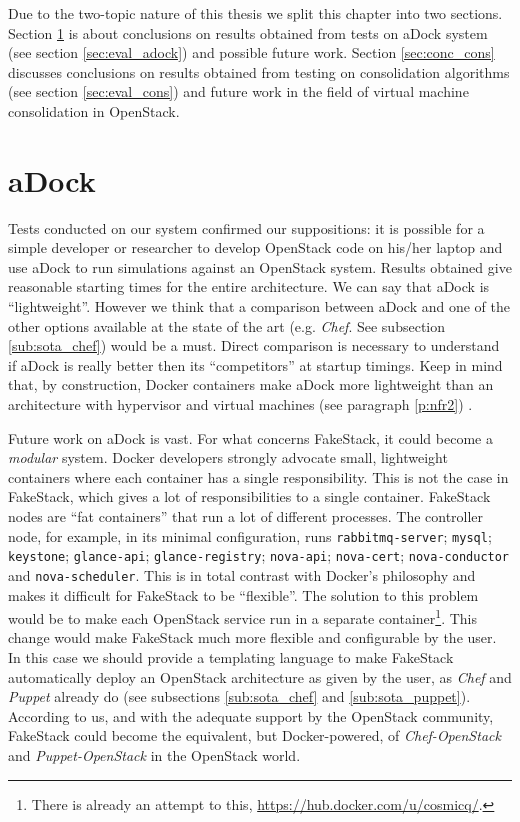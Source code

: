 
Due to the two-topic nature of this thesis we split this chapter into two sections. Section \ref{sec:conc_adock} is about conclusions on results obtained from tests on aDock system (see section \ref{sec:eval_adock}) and possible future work. Section \ref{sec:conc_cons} discusses conclusions on results obtained from testing on consolidation algorithms (see section \ref{sec:eval_cons}) and future work in the field of virtual machine consolidation in OpenStack.

\section{aDock}
\label{sec:conc_adock}
Tests conducted on our system confirmed our suppositions: it is possible for a simple developer or researcher to develop OpenStack code on his/her laptop and use aDock to run simulations against an OpenStack system. Results obtained give reasonable starting times for the entire architecture. We can say that aDock is ``lightweight''. However we think that a comparison between aDock and one of the other options available at the state of the art (e.g. \textit{Chef}. See subsection \ref{sub:sota_chef}) would be a must. Direct comparison is necessary to understand if aDock is really better then its ``competitors'' at startup timings. Keep in mind that, by construction, Docker containers make aDock more lightweight than an architecture with hypervisor and virtual machines (see paragraph \ref{p:nfr2}) .

Future work on aDock is vast. For what concerns FakeStack, it could become a \emph{modular} system. Docker developers strongly advocate small, lightweight containers where each container has a single responsibility. This is not the case in FakeStack, which gives a lot of responsibilities to a single container. FakeStack nodes are ``fat containers'' that run a lot of different processes. The controller node, for example, in its minimal configuration, runs \texttt{rabbitmq-server}; \texttt{mysql}; \texttt{keystone}; \texttt{glance-api}; \texttt{glance-registry}; \texttt{nova-api}; \texttt{nova-cert}; \texttt{nova-conductor} and \texttt{nova-scheduler}. This is in total contrast with Docker's philosophy and makes it difficult for FakeStack to be ``flexible''. The solution to this problem would be to make each OpenStack service run in a separate container\footnote{There is already an attempt to this, \url{https://hub.docker.com/u/cosmicq/}.}. This change would make FakeStack much more flexible and configurable by the user. In this case we should provide a templating language to make FakeStack automatically deploy an OpenStack architecture as given by the user, as \textit{Chef} and \textit{Puppet} already do (see subsections \ref{sub:sota_chef} and \ref{sub:sota_puppet}). According to us, and with the adequate support by the OpenStack community, FakeStack could become the equivalent, but Docker-powered, of \textit{Chef-OpenStack} and \textit{Puppet-OpenStack} in the OpenStack world.

